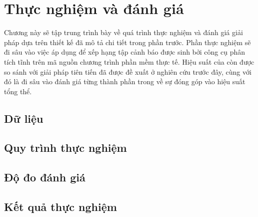 \chapter{Thực nghiệm và đánh giá}
\label{chap:experiment}
Chương này sẽ tập trung trình bày về quá trình thực nghiệm và đánh giá giải pháp \tool dựa trên thiết kế đã mô tả chi tiết trong phần trước. Phần thực nghiệm sẽ đi sâu vào việc áp dụng \tool để xếp hạng tập cảnh báo được sinh bởi công cụ phân tích tĩnh trên mã nguồn chương trình phần mềm thực tế. Hiệu suất của \tool còn được so sánh với giải pháp tiên tiến đã được đề xuất ở nghiên cứu trước đây, cùng với đó là đi sâu vào đánh giá từng thành phần trong \tool về sự đóng góp vào hiệu suất tổng thể.


\section{Dữ liệu}
\section{Quy trình thực nghiệm}
\section{Độ đo đánh giá}
\section{Kết quả thực nghiệm}